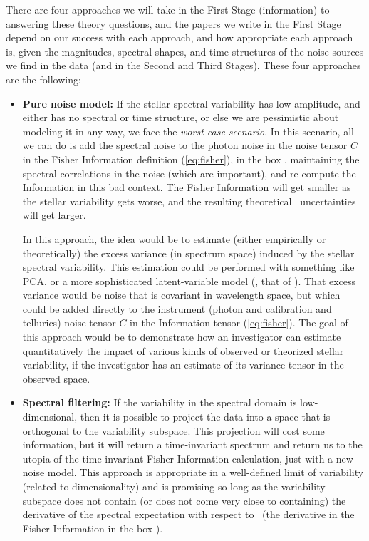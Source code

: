 \documentclass[12pt, letterpaper]{article}
\begin{document}
There are four approaches we will take in the First Stage (information)
to answering these theory questions,
and the papers we write in the First Stage depend on our success with each
approach, and how appropriate each approach is, given the magnitudes, spectral
shapes, and time structures of the noise sources we find in the data (and in
the Second and Third Stages). 
These four approaches are the following:
\begin{itemize}
\item
\textbf{Pure noise model:}
If the stellar spectral variability has low amplitude, and either has
no spectral or time structure, or else we are pessimistic about
modeling it in any way, we face the \emph{worst-case scenario}.
In this scenario, all we can do is add the spectral noise to the photon noise
in the noise tensor $C$ in the Fisher Information definition (\ref{eq:fisher}),
in the box ,
maintaining the spectral correlations in the noise (which are important),
and re-compute the Information in this bad context.
The Fisher Information will get smaller as the stellar variability
gets worse, and the resulting theoretical \EPRV\ uncertainties will
get larger.

In this approach, the idea would be to estimate (either empirically or
theoretically) the excess variance (in spectrum space) induced by the stellar
spectral variability.
This estimation could be performed with something like PCA, or a more
sophisticated latent-variable model (\eg, that of \citealt{HMF}).
That excess variance would be noise that is covariant in wavelength space,
but which could be added directly to the instrument (photon and calibration
and tellurics) noise tensor $C$ in the Information tensor (\ref{eq:fisher}).
The goal of this approach would be to demonstrate how an investigator
can estimate quantitatively the impact of various kinds of observed or
theorized stellar variability, if the investigator has an estimate of
its variance tensor in the observed space.
\item
\textbf{Spectral filtering:}
If the variability in the spectral domain is low-dimensional, then it is
possible to project the data into a space that is orthogonal to the
variability subspace.
This projection will cost some information, but it will return a time-invariant
spectrum and return us to the utopia of the time-invariant Fisher Information
calculation, just with a new noise model.
This approach is appropriate in a well-defined limit of variability (related
to dimensionality) and is
promising so long as the variability subspace does not contain (or does not come very
close to containing) the derivative of the spectral expectation with respect
to \RV\ (the derivative in the Fisher Information in the box ).


\end{itemize}
\end{document}
